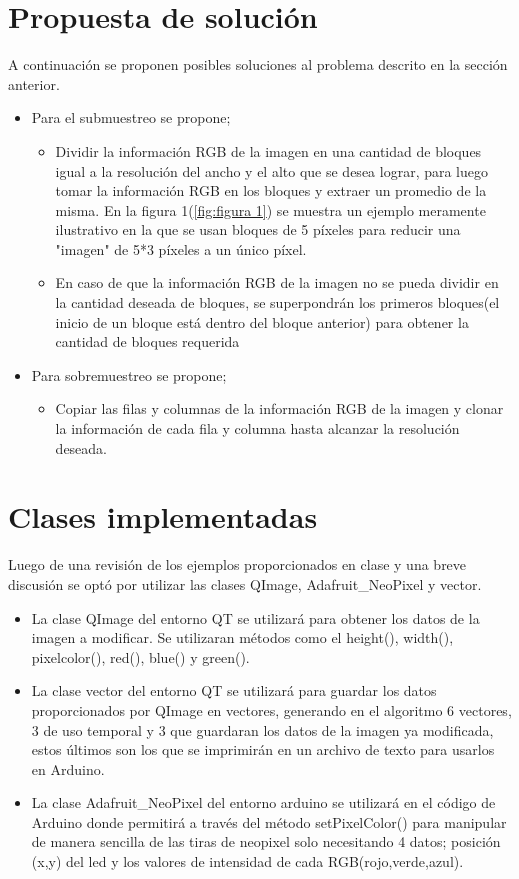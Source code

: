 \documentclass{article}
\begin{document}
	\section{Propuesta de solución} \label{contenido}
	A continuación se proponen posibles soluciones al problema descrito en la sección anterior.
	\begin{itemize}
		\item Para el submuestreo se propone;
		\begin{itemize}
			\item Dividir la información RGB de la imagen en una cantidad de bloques igual a la resolución del ancho y el alto que se desea lograr, para luego tomar la información RGB en los bloques y extraer un promedio de la misma. En la figura 1(\ref{fig:figura 1}) se muestra un ejemplo meramente ilustrativo en la que se usan bloques de 5 píxeles para reducir una "imagen" de 5*3 píxeles a un único píxel.
			\item En caso de que la información RGB de la imagen no se pueda dividir en la cantidad deseada de bloques, se superpondrán los primeros bloques(el inicio de un bloque está dentro del bloque anterior) para obtener la cantidad de bloques requerida
		\end{itemize}
		\item Para sobremuestreo se propone;
		\begin{itemize}
			\item Copiar las filas y columnas de la información RGB de la imagen y clonar la información de cada fila y columna hasta alcanzar la resolución deseada. 
		\end{itemize}
	\end{itemize}
	\section{Clases implementadas} \label{Clases}
	Luego de una revisión de los ejemplos proporcionados en clase y una breve discusión se optó por utilizar las clases QImage, Adafruit\_NeoPixel y vector.
	
	\begin{itemize}
		\item La clase QImage del entorno QT se utilizará para obtener los datos de la imagen a modificar. Se utilizaran métodos como el height(), width(), pixelcolor(), red(), blue() y green().
		\item La clase vector del entorno QT se utilizará para guardar los datos proporcionados por QImage en vectores, generando en el algoritmo 6 vectores, 3 de uso temporal y 3 que guardaran los datos de la imagen ya modificada, estos últimos son los que se imprimirán en un archivo de texto para usarlos en Arduino.
		\item 	La clase Adafruit\_NeoPixel del entorno arduino se utilizará en el código de Arduino donde permitirá a través del método setPixelColor() para manipular de manera sencilla de las tiras de neopixel solo necesitando 4 datos; posición (x,y) del led y los valores de intensidad de cada RGB(rojo,verde,azul).
	\end{itemize}
	
\end{document}

